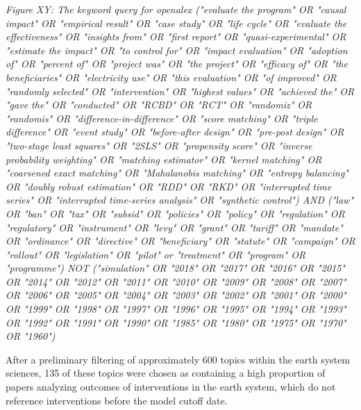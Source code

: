 \documentclass[12pt,a4paper]{article}
\begin{document}
\emph{Figure XY: The keyword query for openalex
("evaluate the program" OR "causal impact" OR "empirical result" OR "case study" OR "life cycle" OR "evaluate the effectiveness" OR "insights from" OR "first report" OR "quasi-experimental" OR "estimate the impact" OR "to control for" OR "impact evaluation" OR "adoption of" OR "percent of" OR "project was" OR "the project" OR "efficacy of" OR "the beneficiaries" OR "electricity use" OR "this evaluation" OR "of improved" OR "randomly selected" OR "intervention" OR "highest values" OR "achieved the" OR "gave the" OR "conducted" OR "RCBD" OR "RCT" OR "randomiz" OR "randomis" OR "difference-in-difference" OR "score matching" OR "triple difference" OR "event study" OR "before-after design" OR "pre-post design" OR "two-stage least squares" OR "2SLS" OR "propensity score" OR "inverse probability weighting" OR "matching estimator" OR "kernel matching" OR "coarsened exact matching" OR "Mahalanobis matching" OR "entropy balancing" OR "doubly robust estimation" OR "RDD" OR "RKD" OR "interrupted time series" OR "interrupted time-series analysis" OR "synthetic control") AND ("law" OR "ban" OR "tax" OR "subsid" OR "policies" OR "policy" OR "regulation" OR "regulatory" OR "instrument" OR "levy" OR "grant" OR "tariff" OR "mandate" OR "ordinance" OR "directive" OR "beneficiary" OR "statute" OR "campaign" OR "rollout" OR "legislation" OR "pilot" or "treatment" OR "program" OR "programme") NOT ("simulation" OR "2018" OR "2017" OR "2016" OR "2015" OR "2014" OR "2012" OR "2011" OR "2010" OR "2009" OR "2008" OR "2007" OR "2006" OR "2005" OR "2004" OR "2003" OR "2002" OR "2001" OR "2000" OR "1999" OR "1998" OR "1997" OR "1996" OR "1995" OR "1994" OR "1993" OR "1992" OR "1991" OR "1990" OR "1985" OR "1980" OR "1975" OR "1970" OR "1960")
}

After a preliminary filtering of approximately 600 topics within the earth system sciences, 135 of these topics were chosen as containing a high proportion of papers analyzing outcomes of interventions in the earth system, which do not reference interventions before the model cutoff date. 
\end{document}
